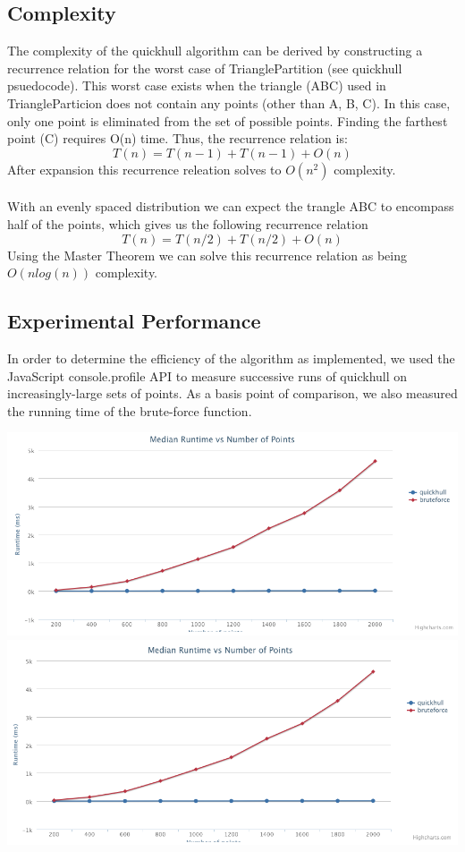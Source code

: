 \documentclass[11pt]{article}
\begin{document}
\subsection{Complexity}
The complexity of the quickhull algorithm can be derived by constructing a recurrence relation for the worst case of TrianglePartition (see quickhull psuedocode). This worst case exists when the triangle (ABC) used in TriangleParticion does not contain any points (other than A, B, C). In this case, only one point is eliminated from the set of possible points. Finding the farthest point (C) requires O(n) time. Thus, the recurrence relation is:
\[ T(n) = T(n - 1) + T(n - 1) + O(n) \]
After expansion this recurrence releation solves to $O(n^2)$ complexity\cite{Kent:QH}.
\\
\\
With an evenly spaced distribution we can expect the trangle ABC to encompass half of the points, which gives us the following recurrence relation
\[ T(n) = T(n / 2) + T(n / 2) + O(n) \]
Using the Master Theorem we can solve this recurrence relation as being $O(n log(n))$ complexity\cite{Kent:QH}.

\subsection{Experimental Performance}
In order to determine the efficiency of the algorithm as implemented, we used the JavaScript console.profile API to measure successive runs of quickhull on increasingly-large sets of points. As a basis point of comparison, we also measured the running time of the brute-force function.

\includegraphics[scale=0.3]{quickhull - raphael-cloud.png} 
\includegraphics[scale=0.3]{quickhull - raphael-circle.png} 
\end{document}

